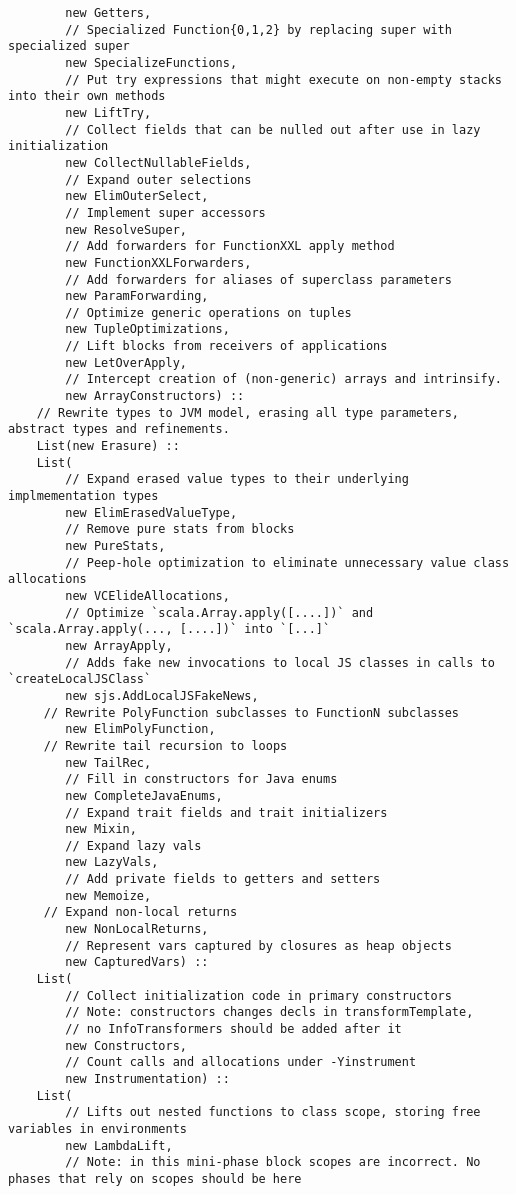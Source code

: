 \documentclass[letterpaper,12pt,titlepage,oneside,final]{book}
\begin{document}
\begin{verbatim}
		new Getters,
		// Specialized Function{0,1,2} by replacing super with specialized super                
		new SpecializeFunctions,  
		// Put try expressions that might execute on non-empty stacks into their own methods  
		new LiftTry, 
		// Collect fields that can be nulled out after use in lazy initialization               
		new CollectNullableFields,  
		// Expand outer selections
		new ElimOuterSelect,
		// Implement super accessors        
		new ResolveSuper,           
		// Add forwarders for FunctionXXL apply method
		new FunctionXXLForwarders,  
		// Add forwarders for aliases of superclass parameters
		new ParamForwarding,     
		// Optimize generic operations on tuples   
		new TupleOptimizations,   
		// Lift blocks from receivers of applications  
		new LetOverApply, 
		// Intercept creation of (non-generic) arrays and intrinsify.          
		new ArrayConstructors) ::  
	// Rewrite types to JVM model, erasing all type parameters, abstract types and refinements.	 
	List(new Erasure) ::            
	List(
		// Expand erased value types to their underlying implmementation types
		new ElimErasedValueType,    
		// Remove pure stats from blocks
		new PureStats,        
		// Peep-hole optimization to eliminate unnecessary value class allocations      
		new VCElideAllocations,   
		// Optimize `scala.Array.apply([....])` and `scala.Array.apply(..., [....])` into `[...]`  
		new ArrayApply,     
		// Adds fake new invocations to local JS classes in calls to `createLocalJSClass`        
		new sjs.AddLocalJSFakeNews, 
	 // Rewrite PolyFunction subclasses to FunctionN subclasses
		new ElimPolyFunction,     
	 // Rewrite tail recursion to loops 
		new TailRec,               
		// Fill in constructors for Java enums
		new CompleteJavaEnums,    
		// Expand trait fields and trait initializers  
		new Mixin,                  
		// Expand lazy vals
		new LazyVals,              
		// Add private fields to getters and setters
		new Memoize,                
	 // Expand non-local returns
		new NonLocalReturns,       
		// Represent vars captured by closures as heap objects
		new CapturedVars) ::        
	List(
		// Collect initialization code in primary constructors
		// Note: constructors changes decls in transformTemplate, 
		// no InfoTransformers should be added after it
		new Constructors,           
		// Count calls and allocations under -Yinstrument
		new Instrumentation) ::     
	List(
		// Lifts out nested functions to class scope, storing free variables in environments
		new LambdaLift,             
		// Note: in this mini-phase block scopes are incorrect. No phases that rely on scopes should be here

\end{verbatim}
\end{document}
